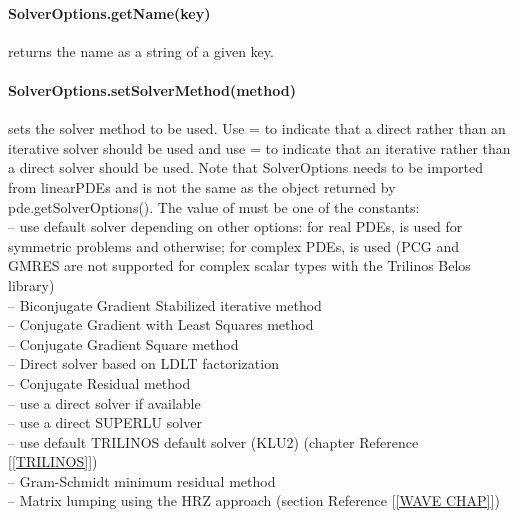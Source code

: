 \paragraph{SolverOptions.getName(key)}
returns the name as a string of a given key.


\paragraph{SolverOptions.setSolverMethod(method)}
sets the solver method to be used.
Use = to indicate that a direct
rather than an iterative solver should be used and use
= to indicate that an iterative
rather than a direct solver should be used. Note that SolverOptions needs to be
imported from linearPDEs and is not the same as the object returned by pde.getSolverOptions().
The value of  must be one of the constants:\\
  -- use default solver depending on other options: for real PDEs, \PCG is used for symmetric problems and \GMRES otherwise; for complex PDEs, \BiCGStab is used (PCG and GMRES are not supported for complex scalar types with the Trilinos Belos library)\\
  -- Biconjugate Gradient Stabilized iterative method\\
  -- Conjugate Gradient with Least Squares method\\
  -- Conjugate Gradient Square method\\
  -- Direct solver based on LDLT factorization\\
  -- Conjugate Residual method\\
  -- use a direct solver if available\\
  -- use a direct SUPERLU solver\\
  -- use default TRILINOS default solver (KLU2) (chapter Reference [\ref{TRILINOS}])\\  
  -- Gram-Schmidt minimum residual method\\
  -- Matrix lumping using the HRZ approach (section Reference [\ref{WAVE CHAP}])\\
